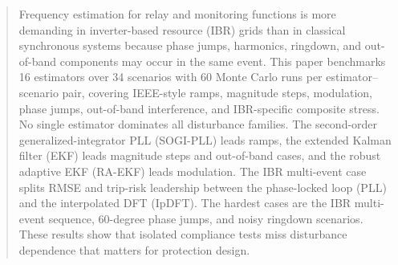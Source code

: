 ﻿\begin{abstract}
Frequency estimation for relay and monitoring functions is more demanding in
inverter-based resource (IBR) grids than in classical synchronous systems
because phase jumps, harmonics, ringdown, and out-of-band components may occur
in the same event. This paper benchmarks 16 estimators over 34 scenarios with
60 Monte Carlo runs per estimator--scenario pair, covering IEEE-style ramps,
magnitude steps, modulation, phase jumps, out-of-band interference, and
IBR-specific composite stress. No single estimator dominates all disturbance
families. The second-order generalized-integrator PLL (SOGI-PLL) leads ramps,
the extended Kalman filter (EKF) leads magnitude steps and out-of-band cases,
and the robust adaptive EKF (RA-EKF) leads modulation. The IBR multi-event case
splits RMSE and trip-risk leadership between the phase-locked loop (PLL) and
the interpolated DFT (IpDFT). The hardest cases are the IBR multi-event
sequence, 60-degree phase jumps, and noisy ringdown scenarios. These results
show that isolated compliance tests miss disturbance dependence that matters
for protection design.
\end{abstract}
